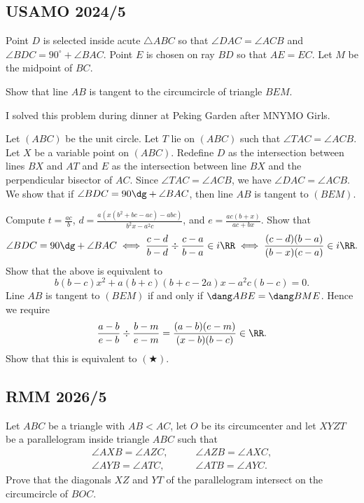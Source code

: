 \documentclass[11pt]{scrartcl}
\begin{document}
\pagebreak

\subsection{USAMO 2024/5}

\begin{example}[USAMO 2024/5]
	Point $D$ is selected inside acute $\triangle ABC$ so that $\angle DAC = \angle ACB$ and $\angle BDC = 90^{\circ} + \angle BAC$. Point $E$ is chosen on ray $BD$ so that $AE = EC$. Let $M$ be the midpoint of $BC$.

	Show that line $AB$ is tangent to the circumcircle of triangle $BEM$.
\end{example}

\begin{walkthrough}
	I solved this problem during dinner at Peking Garden after MNYMO Girls.

	Let $(ABC)$ be the unit circle. Let $T$ lie on $(ABC)$ such that $\angle TAC = \angle ACB$. Let $X$ be a variable point on $(ABC)$. Redefine $D$ as the intersection between lines $BX$ and $AT$ and $E$ as the intersection between line $BX$ and the perpendicular bisector of $AC$. Since $\angle TAC = \angle ACB$, we have $\angle DAC = \angle ACB$. We show that if $\angle BDC = 90\dg + \angle BAC$, then line $AB$ is tangent to $(BEM)$.
	\begin{walk}
		\ii Compute $t = \frac{ac}b$, $d = \frac{a(x(b^2 + bc - ac) - abc)}{b^2x - a^2c}$, and $e = \frac{ac(b + x)}{ac + bx}$.
		\ii Show that
		\[\angle BDC = 90\dg + \angle BAC \iff \frac{c - d}{b - d} \div \frac{c - a}{b - a} \in i\RR \iff \frac{(c - d)(b - a)}{(b - x)(c - a)} \in i\RR.\]
		\ii Show that the above is equivalent to
		\[b(b - c)x^2 + a(b + c)(b + c - 2a)x - a^2c(b - c) = 0. \tag{$\bigstar$}\]
		\ii Line $AB$ is tangent to $(BEM)$ if and only if $\dang ABE = \dang BME$. Hence we require
		\[\frac{a - b}{e - b} \div \frac{b - m}{e - m} = \frac{(a - b)(e - m)}{(x - b)(b - c)} \in \RR.\]
		Show that this is equivalent to $(\bigstar)$.
	\end{walk}
\end{walkthrough}

\pagebreak

\subsection{RMM 2026/5}

\begin{example}[RMM 2026/5]
	Let $ABC$ be a triangle with $AB < AC$, let $O$ be its circumcenter and let $XYZT$ be a parallelogram inside triangle $ABC$ such that
	\begin{align*}
		\angle AXB = \angle AZC, \quad & \quad \angle AZB = \angle AXC, \\
		\angle AYB = \angle ATC, \quad & \quad \angle ATB = \angle AYC.
	\end{align*}
	Prove that the diagonals $XZ$ and $YT$ of the parallelogram intersect on the circumcircle of $BOC$.
\end{example}
	
\end{document}
